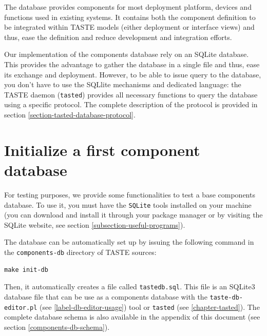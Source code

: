 \documentclass[11pt]{book}
\begin{document}
   The database provides components for most deployment platform,
   devices and functions used in existing systems. It contains both the
   component definition to be integrated within TASTE models (either deployment
   or interface views) and thus, ease the definition and reduce development and
   integration efforts.

   Our implementation of the components database rely on an SQLite database.
   This provides the advantage to gather the database in a single file and thus,
   ease its exchange and deployment. However, to be able to issue query to the
   database, you don't have to use the SQLlite mechanisms and dedicated
   language: the TASTE daemon (\texttt{tasted}) provides all necessary functions
   to query the database using a specific protocol. The complete description of
   the protocol is provided in section
   \ref{section-tasted-database-protocol}.

   \section{Initialize a first component database}
   For testing purposes, we provide some functionalities to test a base
   components database. To use it, you must have the \texttt{SQLite} tools
   installed on your machine (you can download and install it through your
   package manager or by visiting the SQLite website, see section 
   \ref{subsection-useful-programs}).

   The database can be automatically set up by issuing the following command in
   the \texttt{components-db} directory of TASTE sources:
   \begin{verbatim}
make init-db
   \end{verbatim}

   Then, it automatically creates a file called \texttt{tastedb.sql}. This file
   is an SQLite3 database file that can be use as a components database with the
   \texttt{taste-db-editor.pl} (see \ref{label-db-editor-usage}) tool or 
   \texttt{tasted} (see \ref{chapter-tasted}). The complete database schema is
   also available in the appendix of this document (see section \ref{components-db-schema}).
\end{document}
